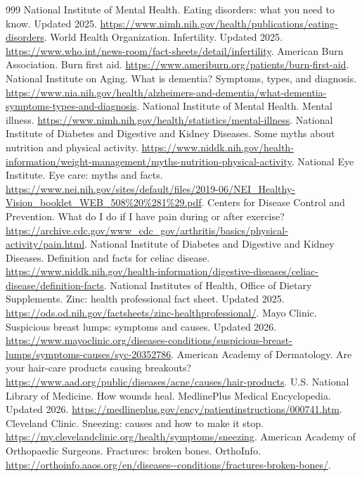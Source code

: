 \documentclass[11pt,oneside]{book}
\begin{document}
\begin{thebibliography}{999}
National Institute of Mental Health. Eating disorders: what you need to know. Updated 2025. \url{https://www.nimh.nih.gov/health/publications/eating-disorders}.
World Health Organization. Infertility. Updated 2025. \url{https://www.who.int/news-room/fact-sheets/detail/infertility}.
American Burn Association. Burn first aid. \url{https://www.ameriburn.org/patients/burn-first-aid}.
National Institute on Aging. What is dementia? Symptoms, types, and diagnosis. \url{https://www.nia.nih.gov/health/alzheimers-and-dementia/what-dementia-symptoms-types-and-diagnosis}.
National Institute of Mental Health. Mental illness. \url{https://www.nimh.nih.gov/health/statistics/mental-illness}.
National Institute of Diabetes and Digestive and Kidney Diseases. Some myths about nutrition and physical activity. \url{https://www.niddk.nih.gov/health-information/weight-management/myths-nutrition-physical-activity}.
National Eye Institute. Eye care: myths and facts. \url{https://www.nei.nih.gov/sites/default/files/2019-06/NEI_Healthy-Vision_booklet_WEB_508\%20\%281\%29.pdf}.
Centers for Disease Control and Prevention. What do I do if I have pain during or after exercise? \url{https://archive.cdc.gov/www_cdc_gov/arthritis/basics/physical-activity/pain.html}.
National Institute of Diabetes and Digestive and Kidney Diseases. Definition and facts for celiac disease. \url{https://www.niddk.nih.gov/health-information/digestive-diseases/celiac-disease/definition-facts}.
National Institutes of Health, Office of Dietary Supplements. Zinc: health professional fact sheet. Updated 2025. \url{https://ods.od.nih.gov/factsheets/zinc-healthprofessional/}.
Mayo Clinic. Suspicious breast lumps: symptoms and causes. Updated 2026. \url{https://www.mayoclinic.org/diseases-conditions/suspicious-breast-lumps/symptoms-causes/syc-20352786}.
American Academy of Dermatology. Are your hair-care products causing breakouts? \url{https://www.aad.org/public/diseases/acne/causes/hair-products}.
U.S. National Library of Medicine. How wounds heal. MedlinePlus Medical Encyclopedia. Updated 2026. \url{https://medlineplus.gov/ency/patientinstructions/000741.htm}.
Cleveland Clinic. Sneezing: causes and how to make it stop. \url{https://my.clevelandclinic.org/health/symptoms/sneezing}.
American Academy of Orthopaedic Surgeons. Fractures: broken bones. OrthoInfo. \url{https://orthoinfo.aaos.org/en/diseases--conditions/fractures-broken-bones/}.

\end{thebibliography}
\end{document}
